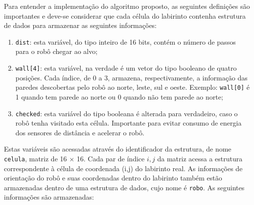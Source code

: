



%
Para entender a implementação do algoritmo proposto, as seguintes definições são importantes e deve-se considerar que cada célula do labirinto contenha estrutura de dados para armazenar as seguintes informações:

\begin{enumerate}[leftmargin=2cm,label=\alph*)]
	\item \verb+dist+: esta variável, do tipo inteiro de 16 bits, contém o número de passos para o robô chegar ao alvo;
	\item \verb+wall[4]+: esta variável, na verdade é um vetor do tipo booleano de quatro posições. Cada índice, de 0 a 3, armazena, respectivamente, a informação das paredes descobertas pelo robô ao norte, leste, sul e oeste. Exemplo: \texttt{wall[0]} é 1 quando tem parede ao norte ou 0 quando não tem parede ao norte;
	\item \verb+checked+: esta variável do tipo booleana é alterada para verdadeiro, caso o robô tenha visitado esta célula. Importante para evitar consumo de energia dos sensores de distância e acelerar o robô.
\end{enumerate}


Estas variáveis são acessadas através do identificador da estrutura, de nome \verb+celula+, matriz de 16 $\times$ 16. Cada par de índice $i,j$ da matriz acessa a estrutura correspondente à célula de coordenada (i,j) do labirinto real.
As informações de orientação do robô e suas coordenadas dentro do labirinto também estão armazenadas dentro de uma estrutura de dados, cujo nome é \verb+robo+. As seguintes informações são armazenadas:


